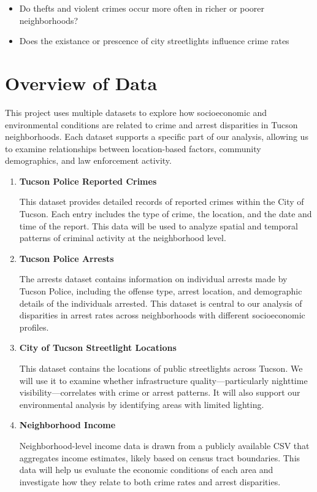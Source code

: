 \documentclass{report}
\begin{document}
\begin{itemize}
\item Do thefts and violent crimes occur more often in richer or poorer neighborhoods?
\item Does the existance or prescence of city streetlights influence crime rates
\end{itemize}

\section{Overview of Data}

This project uses multiple datasets to explore how socioeconomic and environmental conditions are related to crime and arrest disparities in Tucson neighborhoods. Each dataset supports a specific part of our analysis, allowing us to examine relationships between location-based factors, community demographics, and law enforcement activity.

\begin{enumerate}
\item \textbf{Tucson Police Reported Crimes}
  \par This dataset provides detailed records of reported crimes within the City of Tucson. Each entry includes the type of crime, the location, and the date and time of the report. This data will be used to analyze spatial and temporal patterns of criminal activity at the neighborhood level.
  
\item \textbf{Tucson Police Arrests}
  \par The arrests dataset contains information on individual arrests made by Tucson Police, including the offense type, arrest location, and demographic details of the individuals arrested. This dataset is central to our analysis of disparities in arrest rates across neighborhoods with different socioeconomic profiles.
\item \textbf{City of Tucson Streetlight Locations}
  \par This dataset contains the locations of public streetlights across Tucson. We will use it to examine whether infrastructure quality—particularly nighttime visibility—correlates with crime or arrest patterns. It will also support our environmental analysis by identifying areas with limited lighting.
  
\item \textbf{Neighborhood Income}
  \par Neighborhood-level income data is drawn from a publicly available CSV that aggregates income estimates, likely based on census tract boundaries. This data will help us evaluate the economic conditions of each area and investigate how they relate to both crime rates and arrest disparities.
  
  
\end{enumerate}
\end{document}
